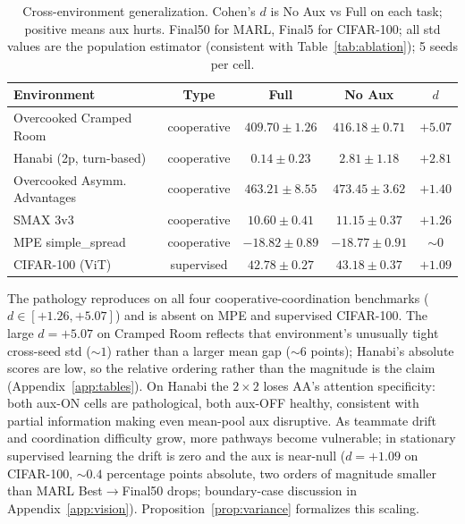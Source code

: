 \documentclass{article}
\theoremstyle{plain}
\theoremstyle{definition}
\theoremstyle{remark}
\begin{document}
\begin{table}[t]
\centering
\caption{Cross-environment generalization. Cohen's $d$ is No Aux vs Full on each task; positive means aux hurts. Final50 for MARL, Final5 for CIFAR-100; all std values are the population estimator (consistent with Table~\ref{tab:ablation}); 5 seeds per cell.}
\label{tab:cross_env}
\small
\setlength{\tabcolsep}{4pt}
\begin{tabular}{lcccc}
\toprule
\textbf{Environment} & \textbf{Type} & \textbf{Full} & \textbf{No Aux} & \textbf{$d$} \\
\midrule
Overcooked Cramped Room      & cooperative & $409.70 \pm 1.26$ & $416.18 \pm 0.71$ & $\mathbf{+5.07}$ \\
Hanabi (2p, turn-based)      & cooperative & $0.14 \pm 0.23$ & $2.81 \pm 1.18$ & $+2.81$ \\
Overcooked Asymm. Advantages & cooperative & $463.21 \pm 8.55$ & $473.45 \pm 3.62$ & $+1.40$ \\
SMAX 3v3                     & cooperative & $10.60 \pm 0.41$ & $11.15 \pm 0.37$ & $+1.26$ \\
\midrule
MPE simple\_spread            & cooperative & $-18.82 \pm 0.89$ & $-18.77 \pm 0.91$ & $\sim 0$ \\
CIFAR-100 (ViT)              & supervised  & $42.78 \pm 0.27$ & $43.18 \pm 0.37$ & $+1.09$ \\
\bottomrule
\end{tabular}
\end{table}

The pathology reproduces on all four cooperative-coordination
benchmarks ($d \in [+1.26, +5.07]$) and is absent on MPE and
supervised CIFAR-100. The large $d = +5.07$ on Cramped Room reflects
that environment's unusually tight cross-seed std ($\sim 1$) rather
than a larger mean gap ($\sim 6$ points); Hanabi's absolute scores
are low, so the relative ordering rather than the magnitude is the
claim (Appendix~\ref{app:tables}). On Hanabi the $2{\times}2$ loses
AA's attention specificity: both aux-ON cells are pathological, both
aux-OFF healthy, consistent with partial information making even
mean-pool aux disruptive. As teammate drift and coordination
difficulty grow, more pathways become vulnerable; in stationary
supervised learning the drift is zero and the aux is near-null
($d = +1.09$ on CIFAR-100, $\sim 0.4$ percentage points absolute,
two orders of magnitude smaller than MARL Best$\to$Final50 drops;
boundary-case discussion in Appendix~\ref{app:vision}).
Proposition~\ref{prop:variance} formalizes this scaling.
\end{document}
